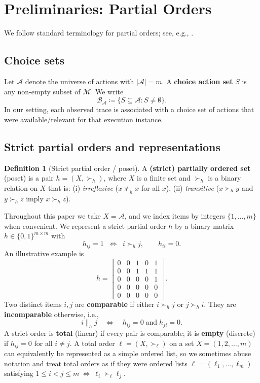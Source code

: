 \documentclass{article}
\theoremstyle{plain}
\theoremstyle{definition}
\newtheorem{definition}[theorem]{Definition}
\theoremstyle{remark}
\begin{document}
\section{Preliminaries: Partial Orders}
\label{appendix:preliminaries_po}

We follow standard terminology for partial orders; see, e.g., \citet{brightwell1993models}.
\subsection{Choice sets}
Let $\mathcal{A}$ denote the universe of actions with $|\mathcal{A}|=m$.
A \textbf{choice action set} $S$ is any non-empty subset of $\mathcal{M}$.
We write
\[
\mathcal{B}_{\mathcal{A}} \coloneqq \{S \subseteq \mathcal{A} : S \neq \emptyset \}.
\]
In our setting, each observed trace is associated with a choice set of actions that
were available/relevant for that execution instance.

\subsection{Strict partial orders and representations}
\begin{definition}[Strict partial order / poset]
\label{def:poset}
A \textbf{(strict) partially ordered set} (poset) is a pair $h=(X,\succ_h)$, where
$X$ is a finite set and $\succ_h$ is a binary relation on $X$ that is:
(i) \emph{irreflexive} ($x \not\succ_h x$ for all $x$),
(ii) \emph{transitive} ($x \succ_h y$ and $y \succ_h z$ imply $x \succ_h z$).
\end{definition}

Throughout this paper we take $X=\mathcal{A}$, and we index items by integers
$\{1,\dots,m\}$ when convenient. We represent a strict partial order $h$ by a
binary matrix $h \in \{0,1\}^{m \times m}$ with
\[
h_{ij} = 1 \;\;\Longleftrightarrow\;\; i \succ_h j,
\qquad h_{ii}=0.
\]
An illustrative example is
\[
h=
\begin{bmatrix}
0 & 0 & 1 & 0 & 1\\
0 & 0 & 1 & 1 & 1\\
0 & 0 & 0 & 0 & 1\\
0 & 0 & 0 & 0 & 0\\
0 & 0 & 0 & 0 & 0
\end{bmatrix}.
\label{eq:poset-adj-matrix}
\]
Two distinct items $i,j$ are \textbf{comparable} if either $i\succ_h j$ or $j\succ_h i$.
They are \textbf{incomparable} otherwise, i.e.,
\[
i \parallel_h j
\quad \Longleftrightarrow \quad
h_{ij}=0 \;\text{and}\; h_{ji}=0.
\]
A strict order is \textbf{total} (linear) if every pair is comparable; it is
\textbf{empty} (discrete) if $h_{ij}=0$ for all $i\neq j$. A total order $\ell=(X,\succ_\ell)$ on a set $X=(1,2,\dots,m)$ can equivalently be represented as a simple ordered list, so we sometimes abuse notation and treat total orders as if they were ordered lists $\ell=(\ell_1,\dots,\ell_m)$ satisfying $1\le i<j\le m\ \Leftrightarrow\ \ell_i\succ_\ell\ell_j$.
\end{document}
